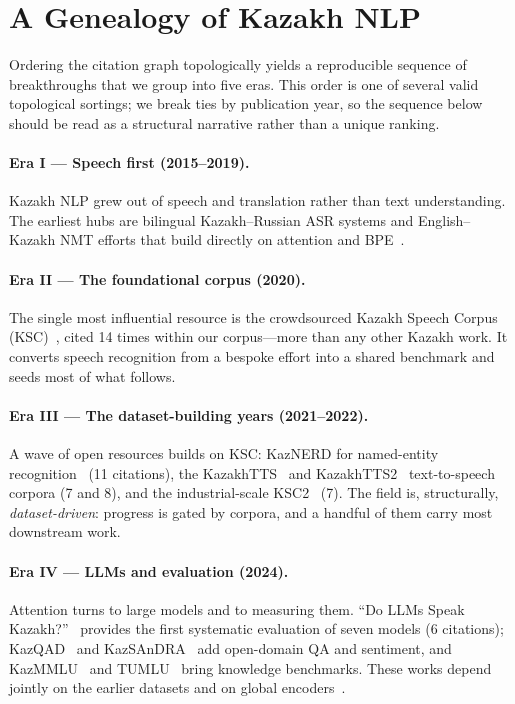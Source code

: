 \documentclass{article}
\begin{document}
\section{A Genealogy of Kazakh NLP}
\label{sec:genealogy}
Ordering the citation graph topologically yields a reproducible sequence of breakthroughs
that we group into five eras. This order is one of several valid topological sortings; we
break ties by publication year, so the sequence below should be read as a structural
narrative rather than a unique ranking.

\paragraph{Era I --- Speech first (2015--2019).}
Kazakh NLP grew out of speech and translation rather than text understanding. The earliest
hubs are bilingual Kazakh--Russian ASR systems and English--Kazakh NMT efforts that build
directly on attention and BPE~\cite{bahdanau,bpe,transformer}.

\paragraph{Era II --- The foundational corpus (2020).}
The single most influential resource is the crowdsourced Kazakh Speech Corpus
(KSC)~\cite{ksc}, cited 14 times within our corpus---more than any other Kazakh work. It
converts speech recognition from a bespoke effort into a shared benchmark and seeds most
of what follows.

\paragraph{Era III --- The dataset-building years (2021--2022).}
A wave of open resources builds on KSC: KazNERD for named-entity
recognition~\cite{kaznerd} (11 citations), the KazakhTTS~\cite{kazakhtts} and
KazakhTTS2~\cite{kazakhtts2} text-to-speech corpora (7 and 8), and the industrial-scale
KSC2~\cite{ksc2} (7). The field is, structurally, \emph{dataset-driven}: progress is
gated by corpora, and a handful of them carry most downstream work.

\paragraph{Era IV --- LLMs and evaluation (2024).}
Attention turns to large models and to measuring them. ``Do LLMs Speak
Kazakh?''~\cite{dollms} provides the first systematic evaluation of seven models (6
citations); KazQAD~\cite{kazqad}
and KazSAnDRA~\cite{kazsandra} add open-domain QA and sentiment, and KazMMLU~\cite{kazmmlu}
and TUMLU~\cite{tumlu} bring knowledge benchmarks. These works depend jointly on the earlier
datasets and on global encoders~\cite{bert,xlmr}.
\end{document}
